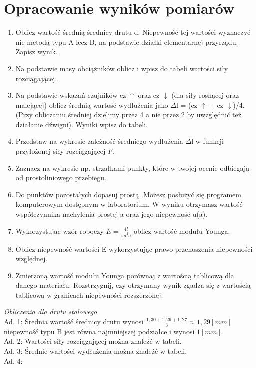 \documentclass[a4paper,10pt,twoside]{article}
\begin{document}
	\section{Opracowanie wyników pomiarów}
	\begin{enumerate}
		\item Oblicz wartość średnią średnicy drutu d. Niepewność tej wartości wyznaczyć nie metodą typu A lecz B, na podstawie działki elementarnej przyrządu. Zapisz wynik.
		\item Na podstawie masy obciążników oblicz i wpisz do tabeli wartości siły rozciągającej.
		\item Na podstawie wskazań czujników cz $\uparrow$ oraz cz $\downarrow$ (dla siły rosnącej oraz malejącej) oblicz średnią wartość wydłużenia jako $\Delta$l = (cz $\uparrow$ + cz $\downarrow$)/4. (Przy obliczaniu średniej
		dzielimy przez 4 a nie przez 2 by uwzględnić też działanie dźwigni). Wyniki wpisz do
		tabeli.
		\item Przedstaw na wykresie zależność średniego wydłużenia $\Delta$l w funkcji przyłożonej siły
		rozciągającej $F$.
		\item Zaznacz na wykresie np. strzałkami punkty, które w twojej ocenie odbiegają od prostoliniowego przebiegu.
		\item Do punktów pozostałych dopasuj prostą. Możesz posłużyć się programem komputerowym dostępnym w laboratorium. W wyniku otrzymasz wartość współczynnika nachylenia prostej a oraz jego niepewność u(a).
		\item Wykorzystując wzór roboczy $E = \frac{4l}{\pi d^2 a}$ oblicz wartość modułu Younga.
		\item Oblicz niepewność wartości E wykorzystując prawo przenoszenia niepewności względnej.
		\item Zmierzoną wartość modułu Younga porównaj z wartością tablicową dla danego materiału. Rozstrzygnij, czy otrzymany wynik zgadza się z wartością tablicową w granicach
		niepewności rozszerzonej.
\end{enumerate}
\vspace{15pt}
\textit{Obliczenia dla drutu stalowego}
\noindent\\
Ad. 1: Średnia wartość średnicy drutu wynosi $\frac{1,30 + 1,29 + 1,27}{3} \approx 1,29[mm]$ niepewność typu B jest równa najmniejszej podziałce i wynosi $1[mm]$.\\
Ad. 2: Wartości siły rozciągającej można znaleźć w tabeli.\\
Ad. 3: Średnie wartości wydłużenia można znaleźć w tabeli.\\
Ad. 4: 
\end{document}
